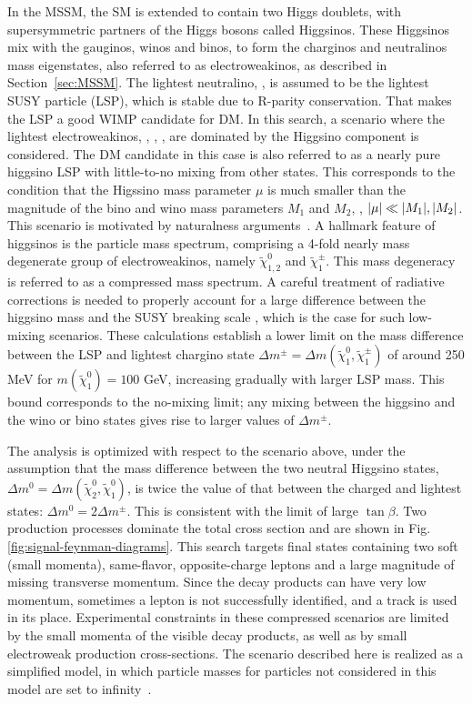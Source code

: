 In the MSSM, the SM is extended to contain two Higgs doublets, with supersymmetric partners of the Higgs bosons called Higgsinos. These Higgsinos mix with the gauginos, winos and binos, to form the charginos and neutralinos mass eigenstates, also referred to as electroweakinos, as described in Section~\ref{sec:MSSM}. The lightest neutralino, \PSGczDo, is assumed to be the lightest SUSY particle (LSP), which is stable due to R-parity conservation. That makes the LSP a good WIMP candidate for DM. In this search, a scenario where the lightest electroweakinos, \PSGczDt, \PSGcpmDo, \PSGczDo, are dominated by the Higgsino component is considered. The DM candidate in this case is also referred to as a nearly pure higgsino LSP with little-to-no mixing from other states. This corresponds to the condition that the Higssino mass parameter $\mu$ is much smaller than the magnitude of the bino and wino mass parameters $M_1$ and $M_2$, \ie, $\abs{\mu}\ll \abs{M_1},\abs{M_2}$. This scenario is motivated by naturalness arguments~\cite{BARBIERI198863,de_Carlos_1993}. A hallmark feature of higgsinos is the particle mass spectrum, comprising a 4-fold nearly mass degenerate group of electroweakinos, namely $\tilde{\chi}_{1,2}^{0}$ and $\tilde{\chi}_{1}^{\pm}$. This mass degeneracy is referred to as a compressed mass spectrum. A careful treatment of radiative corrections is needed to properly account for a large difference between the higgsino mass and the SUSY breaking scale \cite{Nagata_2015}, which is the case for such low-mixing scenarios. These calculations establish a lower limit on the mass difference between the LSP and lightest chargino state $\Delta m^{\pm}=\Delta m(\tilde{\chi}_{1}^{0},\tilde{\chi}_{1}^{\pm})$ of around 250 MeV for $m(\tilde{\chi}_{1}^{0})=100$ GeV, increasing gradually with larger LSP mass. This bound corresponds to the no-mixing limit; any mixing between the higgsino and the wino or bino states gives rise to larger values of $\Delta m^{\pm}$. 

The analysis is optimized with respect to the scenario above, under the assumption that the mass difference between the two neutral Higgsino states, $\Delta m^{0} = \Delta m(\tilde{\chi}_{2}^{0}, \tilde{\chi}_{1}^{0})$, is twice the value of that between the charged and lightest states: $\Delta m^{0} = 2\Delta m^{\pm}$. This is consistent with the limit of large $\tan\beta$. Two production processes dominate the total cross section and are shown in Fig. \ref{fig:signal-feynman-diagrams}. This search targets final states containing two soft (small momenta), same-flavor, opposite-charge leptons and a large magnitude of missing transverse momentum. Since the decay products can have very low momentum, sometimes a lepton is not successfully identified, and a track is used in its place. Experimental constraints in these compressed scenarios are limited by the small momenta of the visible decay products, as well as by small electroweak production cross-sections. The scenario described here is realized as a simplified model, in which particle masses for particles not considered in this model are set to infinity~\cite{Chatrchyan_2013}.

